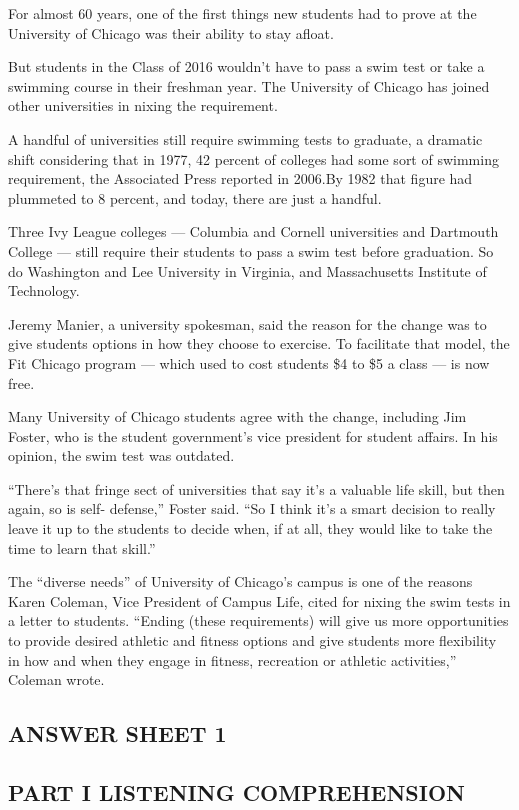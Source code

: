 \documentclass[UTF8,11pt]{ctexart}
\begin{document}
For almost 60 years, one of the first things new students had to prove at the University of Chicago was their ability to stay afloat.


But students in the Class of 2016 wouldn’t have to pass a swim test or take a swimming course in their freshman year. The University of Chicago has joined other universities in nixing the requirement.


A handful of universities still require swimming tests to graduate, a dramatic shift considering that in 1977, 42 percent of colleges had some sort of swimming requirement, the Associated Press reported in 2006.By 1982 that figure had plummeted to 8 percent, and today, there are just a handful.


Three Ivy League colleges — Columbia and Cornell universities and Dartmouth College — still require their students to pass a swim test before graduation. So do Washington and Lee University in Virginia, and Massachusetts Institute of Technology.


Jeremy Manier, a university spokesman, said the reason for the change was to give students options in how they choose to exercise. To facilitate that model, the Fit Chicago program — which used to cost students \$4 to \$5 a class — is now free.


Many University of Chicago students agree with the change, including Jim Foster, who is the student government’s vice president for student affairs. In his opinion, the swim test was outdated.


“There’s that fringe sect of universities that say it’s a valuable life skill, but then again, so is self- defense,” Foster said. “So I think it’s a smart decision to really leave it up to the students to decide when, if at all, they would like to take the time to learn that skill.”


The “diverse needs” of University of Chicago’s campus is one of the reasons Karen Coleman, Vice President of Campus Life, cited for nixing the swim tests in a letter to students. “Ending (these requirements) will give us more opportunities to provide desired athletic and fitness options and give students more flexibility in how and when they engage in fitness, recreation or athletic activities,” Coleman wrote.


\subsection*{\textbf{ANSWER SHEET 1}}


\subsection*{\textbf{PART I LISTENING COMPREHENSION}}
\end{document}
